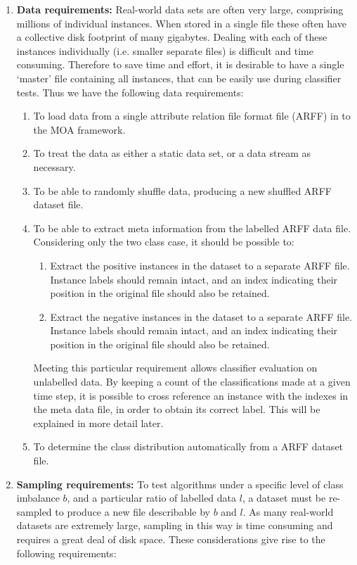 \documentclass[twoside,a4paper]{refart}
\begin{document}
\begin{enumerate}
\item\textbf{Data requirements:} Real-world data sets are often very large, comprising millions of individual instances. When stored in a single file these often have a collective disk footprint of many gigabytes. Dealing with each of these instances individually (i.e. smaller separate files) is difficult and time consuming. Therefore to save time and effort, it is desirable to have a single `master' file containing all instances, that can be easily use during classifier tests. Thus we have the following data requirements:

\begin{enumerate}
\item To load data from a single attribute relation file format file (ARFF) in to the MOA framework.
\item To treat the data as either a static data set, or a data stream as necessary.
\item To be able to randomly shuffle data, producing a new shuffled ARFF dataset file.
\item To be able to extract meta information from the labelled ARFF data file. Considering only the two class case, it should be possible to:
	\begin{enumerate}
	\item Extract the positive instances in the dataset to a separate ARFF file. Instance labels should remain intact, and an index indicating their position in the original file should also be retained.
	\item Extract the negative instances in the dataset to a separate ARFF file. Instance labels should remain intact, and an index indicating their position in the original file should also be retained.
	\end{enumerate}
	Meeting this particular requirement allows classifier evaluation on unlabelled data. By keeping a count of the classifications made at a given time step, it is possible to cross reference an instance with the indexes in the meta data file, in order to obtain its correct label. This will be explained in more detail later.
\item To determine the class distribution automatically from a ARFF dataset file.
\end{enumerate}

\item\textbf{Sampling requirements:} To test algorithms under a specific level of class imbalance $b$, and a particular ratio of labelled data $l$, a dataset must be re-sampled to produce a new file describable by $b$ and $l$. As many real-world datasets are extremely large, sampling in this way is time consuming and requires a great deal of disk space. These considerations give rise to the following requirements:


\end{enumerate}
\end{document}
